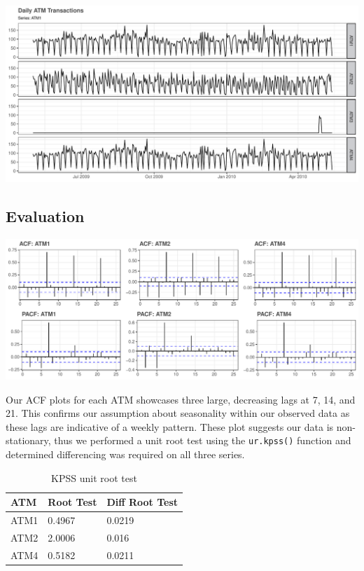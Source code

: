 \documentclass[openany]{book}
\begin{document}
\includegraphics{Part-A-JM_files/figure-latex/unnamed-chunk-3-1.pdf}

\hypertarget{evaluation}{%
\subsection{Evaluation}\label{evaluation}}

\includegraphics{Part-A-JM_files/figure-latex/unnamed-chunk-4-1.pdf}

Our ACF plots for each ATM showcases three large, decreasing lags at 7,
14, and 21. This confirms our assumption about seasonality within our
observed data as these lags are indicative of a weekly pattern. These
plot suggests our data is non-stationary, thus we performed a unit root
test using the \texttt{ur.kpss()} function and determined differencing
was required on all three series.

\begin{table}[H]

\caption{\label{tab:unnamed-chunk-5}KPSS unit root test}
\centering
\begin{tabular}{l|l|l}
\hline
\textbf{ATM} & \textbf{Root Test} & \textbf{Diff Root Test}\\
\hline
\rowcolor{gray!6}  ATM1 & 0.4967 & 0.0219\\
\hline
ATM2 & 2.0006 & 0.016\\
\hline
\rowcolor{gray!6}  ATM4 & 0.5182 & 0.0211\\
\hline
\end{tabular}
\end{table}
\end{document}
